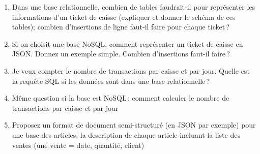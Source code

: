 \documentclass[11pt,a4paper]{article}
\begin{document}
\begin{enumerate}
  \item Dans une base relationnelle, combien de tables faudrait-il pour représenter 
         les informations d'un ticket de caisse (expliquer et donner le schéma de ces tables); combien d'insertions de ligne
             faut-il faire pour chaque ticket\,?
    \item Si on choisit une base NoSQL, comment représenter un ticket de caisse en JSON.
        Donnez un exemple simple. Combien d'insertions faut-il faire\,?
   \item Je veux compter le nombre de transactions par caisse et par jour.  Quelle est la requête SQL si les données
       sont dans une base relationnelle\,?
    \item Même question si la base est NoSQL\,: comment calculer le nombre de transactions par caisse et par jour
    \item Proposez un format de document semi-structuré (en JSON par exemple) pour une base
         des articles, la description de chaque article incluant la liste des ventes (une vente = date,
         quantité, client)
 \end{enumerate}
\end{document}
